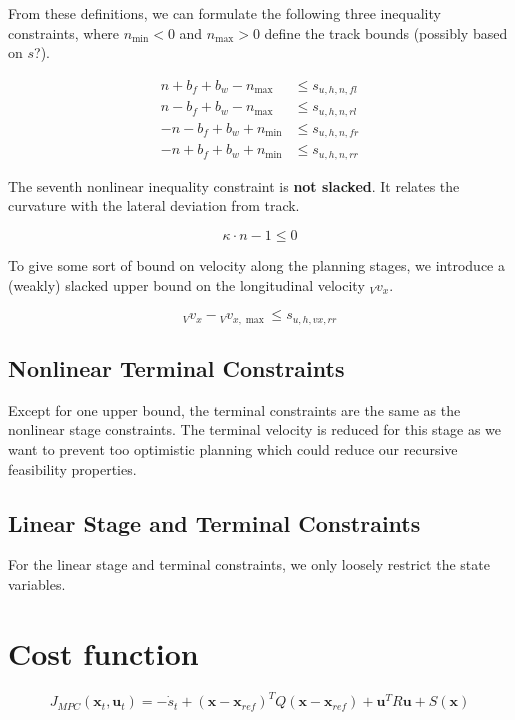 \documentclass[
a4paper, %
10pt, %
notitlepage,
english]{CSUniSchoolLabReport}
\begin{document}
From these definitions, we can formulate the following three inequality constraints, where $n_{\min} < 0$ and $n_{\max}>0$ define the track bounds (possibly based on $s$?).

\begin{align}
	n + b_f + b_w - n_{\max} &\leq s_{u,h,n,fl} \\
	n - b_f + b_w - n_{\max} &\leq s_{u,h,n,rl} \\
	- n - b_f + b_w + n_{\min} &\leq s_{u,h,n,fr} \\
	- n + b_f + b_w + n_{\min} &\leq s_{u,h,n,rr}
\end{align}

The seventh nonlinear inequality constraint is \textbf{not slacked}. It relates the curvature with the lateral deviation from track.

\begin{equation}
	\kappa \cdot n - 1 \leq 0
\end{equation}

To give some sort of bound on velocity along the planning stages, we introduce a (weakly) slacked upper bound on the longitudinal velocity ${}_Vv_x$.

\begin{equation}
	{}_Vv_x - {}_Vv_{x, \max} \leq s_{u,h,vx,rr}
\end{equation}

\subsection{Nonlinear Terminal Constraints}

Except for one upper bound, the terminal constraints are the same as the nonlinear stage constraints. The terminal velocity is reduced for this stage as we want to prevent too optimistic planning which could reduce our recursive feasibility properties.

\subsection{Linear Stage and Terminal Constraints}

For the linear stage and terminal constraints, we only loosely restrict the state variables.


\section{Cost function}
\begin{center}
	\begin{equation}
		J_{MPC}(\textbf{x}_t, \textbf{u}_t) = -\dot{s}_t + (\textbf{x} - \textbf{x}_{ref})^T Q (\textbf{x} - \textbf{x}_{ref}) + \textbf{u}^T R \textbf{u} + S(\textbf{x})
	\end{equation}
\end{center}
\end{document}

